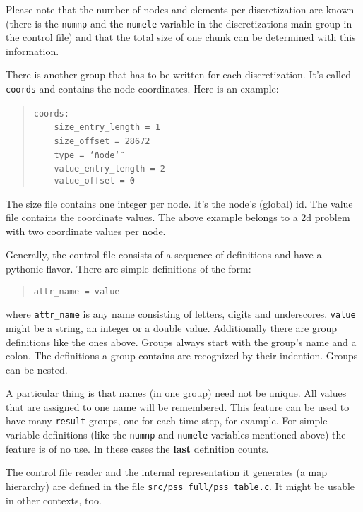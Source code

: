 Please note that the number of nodes and elements per discretization
are known (there is the \texttt{numnp} and the \texttt{numele} variable
in the discretizations main group in the control file) and that the
total size of one chunk can be determined with this information.

There is another group that has to be written for each discretization.
It's called \texttt{coords} and contains the node coordinates. Here
is an example: 

\begin{quote}
\texttt{coords:~}~\\
 \texttt{~~~~size{\_}entry{\_}length~=~1~}~\\
 \texttt{~~~~size{\_}offset~=~28672~}~\\
 \texttt{~~~~type~=~\char`\"{}node\char`\"{}~}~\\
 \texttt{~~~~value{\_}entry{\_}length~=~2~}~\\
 \texttt{~~~~value{\_}offset~=~0 }
\end{quote}
The size file contains one integer per node. It's the node's (global)
id. The value file contains the coordinate values. The above example
belongs to a 2d problem with two coordinate values per node.

Generally, the control file consists of a sequence of definitions
and have a pythonic flavor. There are simple definitions of the form: 

\begin{quote}
\texttt{attr{\_}name~=~value }
\end{quote}
where \texttt{attr{\_}name} is any name consisting of letters, digits
and underscores. \texttt{value} might be a string, an integer or a
double value. Additionally there are group definitions like the ones
above. Groups always start with the group's name and a colon. The
definitions a group contains are recognized by their indention. Groups
can be nested.

A particular thing is that names (in one group) need not be unique.
All values that are assigned to one name will be remembered. This
feature can be used to have many \texttt{result} groups, one for each
time step, for example. For simple variable definitions (like the
\texttt{numnp} and \texttt{numele} variables mentioned above) the
feature is of no use. In these cases the \textbf{last} definition
counts.

The control file reader and the internal representation it generates
(a map hierarchy) are defined in the file \texttt{src/pss{\_}full/pss{\_}table.c}.
It might be usable in other contexts, too.


